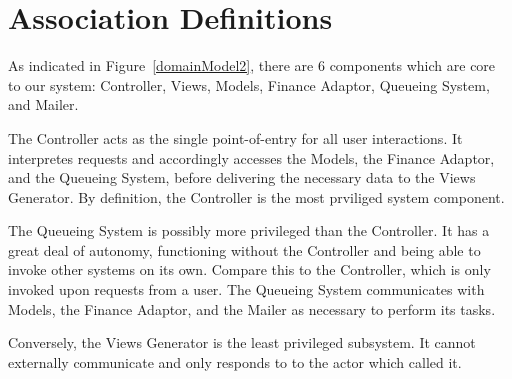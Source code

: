 %
%
%
%
%
%
\section{Association Definitions}

As indicated in Figure~\ref{domainModel2}, there are 6 components which are core
to our system: Controller, Views, Models, Finance Adaptor, Queueing System, and
Mailer.

The Controller acts as the single point-of-entry for all user interactions. It
interpretes requests and accordingly accesses the Models, the Finance Adaptor,
and the Queueing System, before delivering the necessary data to the Views
Generator. By definition, the Controller is the most prviliged system component.

The Queueing System is possibly more privileged than the Controller. It has a great deal
of autonomy, functioning without the Controller and being able to invoke other systems
on its own. Compare this to the Controller, which is only invoked upon requests from
a user. The Queueing System communicates with Models, the Finance Adaptor, and the 
Mailer as necessary to perform its tasks.

Conversely, the Views Generator is the least privileged subsystem. It cannot
externally communicate and only responds to to the actor which called it.

